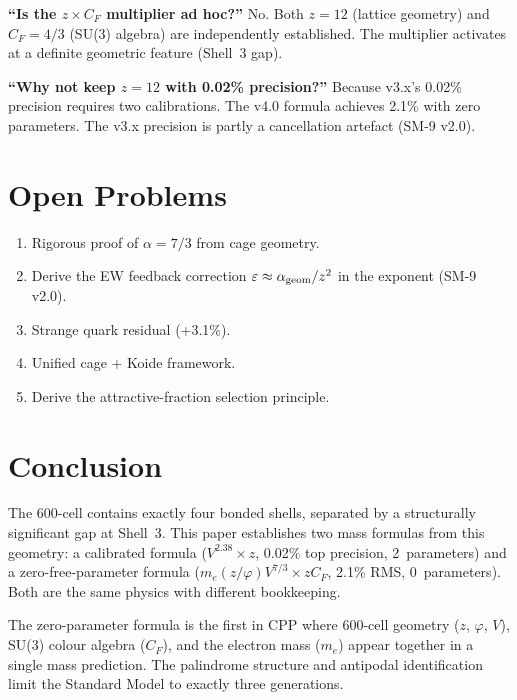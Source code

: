 \documentclass[11pt,letterpaper]{article}
\newcommand{\phig}{\varphi}
\begin{document}
\textbf{``Is the $z \times C_F$ multiplier ad hoc?''}
No.  Both $z = 12$ (lattice geometry) and $C_F = 4/3$ (SU(3)
algebra) are independently established.  The multiplier activates
at a definite geometric feature (Shell~3 gap).

\textbf{``Why not keep $z = 12$ with 0.02\% precision?''}
Because v3.x's 0.02\% precision requires two calibrations.  The
v4.0 formula achieves 2.1\% with zero parameters.  The v3.x
precision is partly a cancellation artefact (SM-9 v2.0).

\section{Open Problems}
\label{sec:future}

\begin{enumerate}
\item Rigorous proof of $\alpha = 7/3$ from cage geometry.
\item Derive the EW feedback correction $\varepsilon \approx
  \alpha_{\rm geom}/z^2$ in the exponent (SM-9 v2.0).
\item Strange quark residual (+3.1\%).
\item Unified cage + Koide framework.
\item Derive the attractive-fraction selection principle.
\end{enumerate}

\section{Conclusion}
\label{sec:conclusion}

The 600-cell contains exactly four bonded shells, separated by a
structurally significant gap at Shell~3.  This paper establishes
two mass formulas from this geometry: a calibrated formula
($V^{2.38} \times z$, 0.02\% top precision, 2~parameters) and a
zero-free-parameter formula ($m_e(z/\phig) V^{7/3} \times z C_F$,
2.1\% RMS, 0~parameters).  Both are the same physics with
different bookkeeping.

The zero-parameter formula is the first in CPP where 600-cell
geometry ($z$, $\phig$, $V$), SU(3) colour algebra ($C_F$), and
the electron mass ($m_e$) appear together in a single mass
prediction.  The palindrome structure and antipodal identification
limit the Standard Model to exactly three generations.
\end{document}
